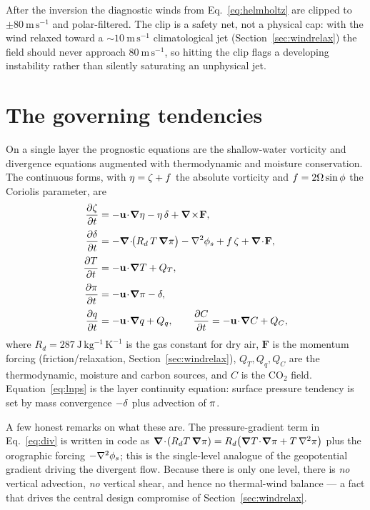 After the inversion the diagnostic winds from Eq.~\eqref{eq:helmholtz} are clipped
to $\pm 80\ \mathrm{m\,s^{-1}}$ and polar-filtered. The clip is a safety net, not a
physical cap: with the wind relaxed toward a $\sim 10\ \mathrm{m\,s^{-1}}$
climatological jet (Section~\ref{sec:windrelax}) the field should never approach
$80\ \mathrm{m\,s^{-1}}$, so hitting the clip flags a developing instability rather
than silently saturating an unphysical jet.

\section{The governing tendencies}

On a single layer the prognostic equations are the shallow-water vorticity and
divergence equations augmented with thermodynamic and moisture conservation. The
continuous forms, with $\eta=\zeta+f$ the absolute vorticity and
$f=2\Omega\sin\phi$ the Coriolis parameter, are
\begin{align}
  \pd{\vort}{t} &= -\uvec\!\cdot\!\grad\eta - \eta\,\divg + \curl\mathbf{F},
    \label{eq:vort} \\[2pt]
  \pd{\divg}{t} &= -\diver\!\big(R_d\,T\,\grad\lnps\big) - \lap\phi_s
                   + \Cor\,\vort + \diver\mathbf{F},
    \label{eq:div} \\[2pt]
  \pd{T}{t}    &= -\uvec\!\cdot\!\grad T + Q_T,
    \label{eq:temp} \\[2pt]
  \pd{\lnps}{t} &= -\uvec\!\cdot\!\grad\lnps - \divg,
    \label{eq:lnps} \\[2pt]
  \pd{\spechum}{t} &= -\uvec\!\cdot\!\grad\spechum + Q_q,
    \qquad
  \pd{C}{t} = -\uvec\!\cdot\!\grad C + Q_C,
    \label{eq:tracers}
\end{align}
where $R_d=287\ \mathrm{J\,kg^{-1}\,K^{-1}}$ is the gas constant for dry air,
$\mathbf{F}$ is the momentum forcing (friction/relaxation, Section~\ref{sec:windrelax}),
$Q_T,Q_q,Q_C$ are the thermodynamic, moisture and carbon sources, and $C$ is the
CO$_2$ field. Equation~\eqref{eq:lnps} is the layer continuity equation: surface
pressure tendency is set by mass convergence $-\delta$ plus advection of $\pi$.

A few honest remarks on what these are. The pressure-gradient term in
Eq.~\eqref{eq:div} is written in code as
$\boldsymbol{\nabla}\!\cdot\!(R_d T\,\boldsymbol{\nabla}\pi) = R_d\big(\boldsymbol{\nabla} T\!\cdot\!\boldsymbol{\nabla}\pi + T\,\nabla^{2}\pi\big)$
plus the orographic forcing $-\nabla^{2}\phi_s$; this is the single-level analogue of the
geopotential gradient driving the divergent flow. Because there is only one level,
there is \emph{no} vertical advection, \emph{no} vertical shear, and hence no
thermal-wind balance --- a fact that drives the central design compromise of
Section~\ref{sec:windrelax}.

